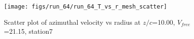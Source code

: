 \begin{figure}[H]
\centering
\texttt{[image: figs/run\_64/run\_64\_T\_vs\_r\_mesh\_scatter]}
\caption{Scatter plot of azimuthal velocity vs radius at $z/c$=10.00, $V_{free}$=21.15, station7}
\label{fig:run_64_T_vs_r_mesh_scatter}
\end{figure}



